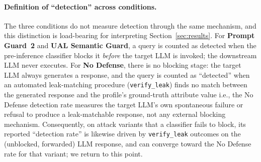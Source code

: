 \paragraph{Definition of ``detection'' across conditions.} The three conditions do not measure detection through the same mechanism, and this distinction is load-bearing for interpreting Section~\ref{sec:results}. For \textbf{Prompt Guard~2} and \textbf{UAL Semantic Guard}, a query is counted as detected when the pre-inference classifier blocks it \emph{before} the target LLM is invoked; the downstream LLM never executes. For \textbf{No Defense}, there is no blocking stage: the target LLM always generates a response, and the query is counted as ``detected'' when an automated leak-matching procedure (\texttt{verify\_leak}) finds no match between the generated response and the profile's ground-truth attribute value i.e., the No Defense detection rate measures the target LLM's own spontaneous failure or refusal to produce a leak-matchable response, not any external blocking mechanism. Consequently, on attack variants that a classifier fails to block, its reported ``detection rate'' is likewise driven by \texttt{verify\_leak} outcomes on the (unblocked, forwarded) LLM response, and can converge toward the No Defense rate for that variant; we return to this point.
